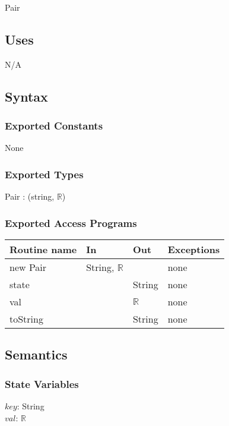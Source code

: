 \documentclass[12pt]{article}
\begin{document}
Pair

\subsection* {Uses}

N/A

\subsection* {Syntax}

\subsubsection* {Exported Constants}

None

\subsubsection* {Exported Types}

Pair : (string, $\mathbb{R}$)

\subsubsection* {Exported Access Programs}

\begin{tabular}{| l | l | l | p{5cm} |}
\hline
\textbf{Routine name} & \textbf{In} & \textbf{Out} & \textbf{Exceptions}\\
\hline
new Pair & String, $\mathbb{R}$ &  & none\\
\hline
state &  & String & none\\
\hline
val &  & $\mathbb{R}$ & none\\
\hline
toString &  & String & none\\
\hline
\end{tabular}

\subsection* {Semantics}

\subsubsection* {State Variables}

$key$: String\\
$val$: $\mathbb{R}$\\
\end{document}
